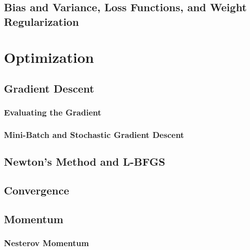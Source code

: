 	\section{Bias and Variance, Loss Functions, and Weight Regularization} %

\chapter{Optimization} %

	\section{Gradient Descent} %

		\subsection{Evaluating the Gradient} %

		\subsection{Mini-Batch and Stochastic Gradient Descent} %

	\section{Newton's Method and L-BFGS} %

	\section{Convergence} %

	\section{Momentum} %

		\subsection{Nesterov Momentum} %


